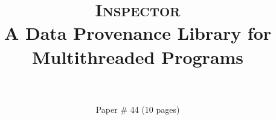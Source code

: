 \documentclass{IEEEtran}
\newcommand{\projecttitle}{\textsc{Inspector}\xspace}
\begin{document}
\author{
\\
\\
Paper \# 44 (10 pages)
}

\title{\huge \projecttitle\\A Data Provenance Library for Multithreaded Programs}
\maketitle


















 
\end{document}
